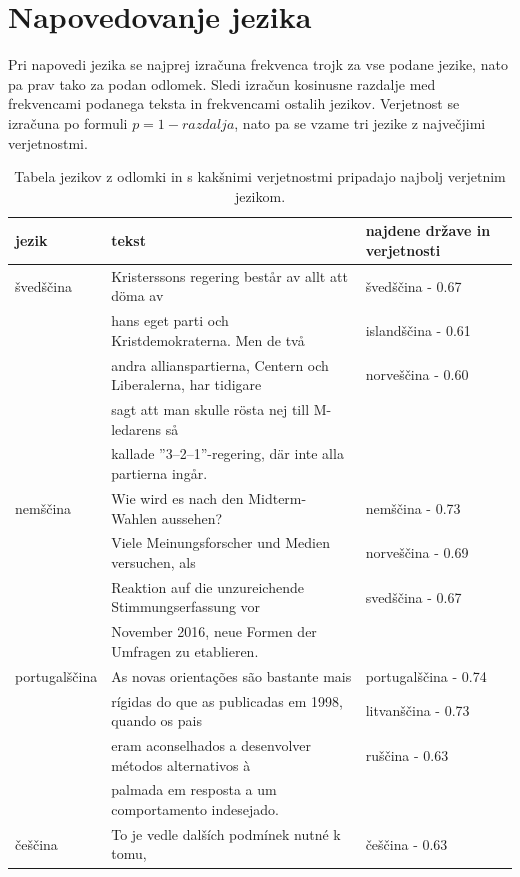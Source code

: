 \documentclass[a4paper,11pt]{article}
\begin{document}
\pagebreak
\section{Napovedovanje jezika}
Pri napovedi jezika se najprej izračuna frekvenca trojk za vse podane jezike, nato pa prav tako za podan odlomek. Sledi izračun kosinusne razdalje med frekvencami podanega teksta in frekvencami ostalih jezikov. Verjetnost se izračuna po formuli $p = 1 - razdalja$, nato pa se vzame tri jezike z največjimi verjetnostmi. 

\begin{table}[htbp]
	\caption{Tabela jezikov z odlomki in s kakšnimi verjetnostmi pripadajo najbolj verjetnim jezikom.}
	\label{tab1}
	\begin{center}
		\begin{tabular}{llp{3cm}}
			\hline
			jezik & tekst & najdene države in verjetnosti \\
			\hline
			švedščina & Kristerssons regering består av allt att döma av & švedščina - 0.67\\
			& hans eget parti och Kristdemokraterna. Men de två & islandščina - 0.61\\
			 & andra allianspartierna, Centern och Liberalerna, har tidigare & norveščina - 0.60\\
			 & sagt att man skulle rösta nej till M-ledarens så & \\
			 & kallade ”3–2–1”-regering, där inte alla partierna ingår. & \\
			 nemščina & Wie wird es nach den Midterm-Wahlen aussehen?& nemščina - 0.73 \\
			 & Viele Meinungsforscher und Medien versuchen, als  & norveščina - 0.69\\
			 & Reaktion auf die unzureichende Stimmungserfassung vor & svedščina - 0.67\\
			 & November 2016, neue Formen der Umfragen zu etablieren.  & \\
			 portugalščina & As novas orientações são bastante mais & portugalščina - 0.74\\
			 & rígidas do que as publicadas em 1998, quando os pais & litvanščina - 0.73\\ 
			 & eram aconselhados a desenvolver métodos alternativos à & ruščina - 0.63\\
			 & palmada em resposta a um comportamento indesejado. &  \\
			 češčina & To je vedle dalších podmínek nutné k tomu, & češčina - 0.63\\

\end{tabular}
\end{center}
\end{table}
\end{document}
